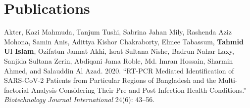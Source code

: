 \documentclass[letterpaper,10pt]{article}
\begin{document}
    \section{Publications}
    Akter, Kazi Mahmuda, Tanjum Tushi, Sabrina Jahan Mily, Rashenda Aziz Mohona, Samin Anis, Adittya Kishor Chakraborty, Elmee Tabassum, \textbf{Tahmid Ul Islam}, Ozifatun Jannat Akhi, Israt Sultana Nishe, Badrun Nahar Laxy, Sanjida Sultana Zerin, Abdiqani Jama Roble, Md. Imran Hossain, Sharmin Ahmed, and Salauddin Al Azad. 2020. ``RT-PCR Mediated Identification of SARS-CoV-2 Patients from Particular Regions of Bangladesh and the Multi-factorial Analysis Considering Their Pre and Post Infection Health Conditions.'' \textit{Biotechnology Journal International} 24(6): 43--56.

    \vspace{0.65em}

\end{document}
